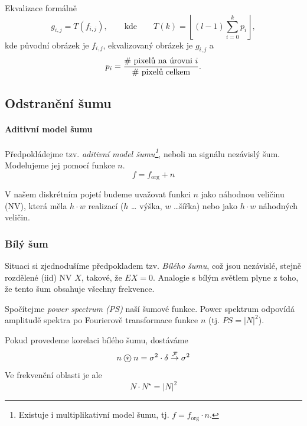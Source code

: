 Ekvalizace formálně
\begin{equation}
g_{i,j} = T(f_{i,j}), \qquad \text{kde} \qquad T(k) = \left \lfloor (l-1) \sum_{i=0}^{k} p_i \right \rfloor,
\end{equation}
kde původní obrázek je $ f_{i,j} $, ekvalizovaný obrázek je $ g_{i,j} $ a
\[
p_i = \frac{\# \text{ pixelů na úrovni $ i $}}{\# \text{ pixelů celkem}}.
\]


\subsection{Odstranění šumu}

\paragraph{Aditivní model šumu}
Předpokládejme tzv. \emph{aditivní model šumu\footnote{Existuje i multiplikativní model šumu, tj. $f=f_{\mathrm{org}}\cdot n$.}}, neboli na signálu nezávislý šum. Modelujeme jej pomocí funkce $n$.
\begin{equation}
f=f_{\mathrm{org}}+n
\end{equation}

V našem diskrétním pojetí budeme uvažovat funkci $n$ jako náhodnou veličinu (NV), která měla $h\cdot w$ realizací ($h$ \dots
výška, $w$ \dots šířka) nebo jako $h\cdot w$ náhodných veličin. 

\subsubsection{Bílý šum}

Situaci si zjednodušíme předpokladem tzv. \emph{Bílého šumu}, což jsou nezávislé, stejně rozdělené (iid) NV $X$, takové, že $EX=0$.
Analogie s bílým světlem plyne z toho, že tento šum obsahuje všechny frekvence. 

Spočítejme \emph{power spectrum (PS)} naší šumové funkce. Power spektrum odpovídá amplitudě spektra po Fourierově transformace funkce $n$ (tj. $PS=|N|^2$).
 
Pokud provedeme korelaci bílého šumu, dostáváme
\begin{equation}
n\corr n = \sigma^2\cdot \delta\stackrel{\CFT}{\rightarrow}\sigma^2\label{korel}
\end{equation}
Ve frekvenční oblasti je ale
\begin{equation}
N\cdot N^\star = |N|^2
\end{equation}

